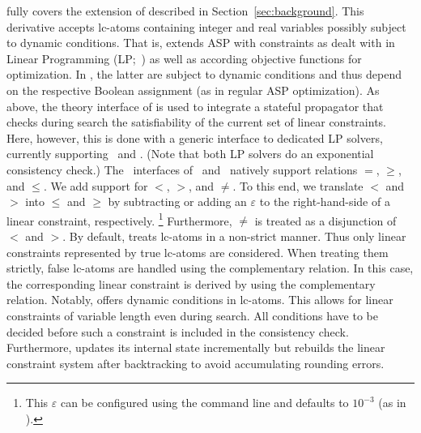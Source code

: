 \textbf{}
fully covers the extension of  described in Section~\ref{sec:background}.
This \clingo{} derivative accepts lc-atoms containing integer and real variables possibly subject to dynamic conditions.
That is,  extends ASP with constraints as dealt with in Linear Programming (LP;~\cite{dantzig63a})
as well as according objective functions for optimization. 
In , the latter are subject to dynamic conditions and thus depend on the respective Boolean assignment
(as in regular ASP optimization).
%
As above,
the theory interface of \clingo{} is used to integrate a stateful propagator that checks during search 
the satisfiability of the current set of linear constraints.
Here, however, this is done with a generic interface to dedicated LP solvers,
currently supporting \cplex\ and \lpsolve.
(Note that both LP solvers do an exponential consistency check.) %
%
The \python\ interfaces of \cplex\ and \lpsolve\ natively support relations $=$, $\geq$, and $\leq$. 
We add support for $<$, $>$, and $\neq$.
To this end, %
we translate $<$ and $>$ into $\leq$ and $\geq$ by subtracting or adding an $\varepsilon$ to the right-hand-side of a linear constraint, respectively.%
\footnote{This $\varepsilon$ can be configured using the command line and defaults to $10^{-3}$ (as in \cplex).}
Furthermore, $\neq$ is treated as a disjunction of $<$ and $>$.
%
By default,  treats lc-atoms in a non-strict manner.
Thus only linear constraints represented by true lc-atoms are considered.
When treating them strictly, false lc-atoms are handled using the complementary relation.
In this case, 
the corresponding linear constraint is derived by using the complementary relation.
%
Notably,  offers dynamic conditions in lc-atoms.
This allows for linear constraints of variable length even during search.
All conditions have to be decided before such a constraint is included in the consistency check.
Furthermore,  updates its internal state incrementally 
but rebuilds the linear constraint system after backtracking to avoid accumulating rounding errors. 
%

